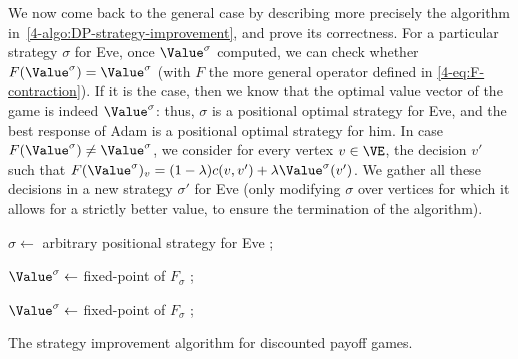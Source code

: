 \medskip

We now come back to the general case by describing more precisely the
algorithm in~\cref{4-algo:DP-strategy-improvement}, and prove its
correctness.  For a particular strategy $\sigma$ for Eve, once
$\Value^\sigma$ computed, we can check whether
$F(\Value^\sigma)=\Value^\sigma$ (with $F$ the more general operator
defined in \eqref{4-eq:F-contraction}). If it is the case, then we
know that the optimal value vector of the game is indeed
$\Value^\sigma$: thus, $\sigma$ is a positional optimal strategy for
Eve, and the best response of Adam is a positional optimal strategy
for him. In case $F(\Value^\sigma)\neq\Value^\sigma$, we consider for
every vertex $v\in \VE$, the decision $v'$ such that
$F(\Value^\sigma)_v=(1-\lambda)c(v,v')+\lambda \Value^\sigma(v')$. We
gather all these decisions in a new strategy $\sigma'$ for Eve (only
modifying $\sigma$ over vertices for which it allows for a strictly
better value, to ensure the termination of the algorithm).

\begin{algorithm}

 $\sigma \leftarrow$ arbitrary positional strategy for Eve ;

 $\Value^\sigma \leftarrow $ fixed-point of $F_\sigma$ ;

 {   
 {
}

  $\Value^\sigma \leftarrow $ fixed-point of $F_\sigma$ ;

}

\Return{$(\Value^\sigma,\sigma)$}
\caption{The strategy improvement algorithm for discounted payoff games.}
\label{4-algo:DP-strategy-improvement}
\end{algorithm}

